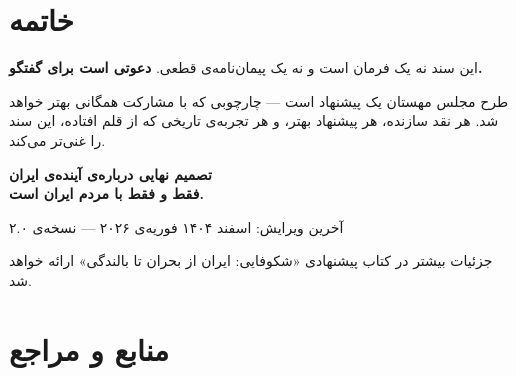 \chapter*{خاتمه}

\begin{summarybox}
این سند نه یک فرمان است و نه یک پیمان‌نامه‌ی قطعی. \textbf{دعوتی است برای گفتگو.}

طرح مجلس مهستان یک پیشنهاد است --- چارچوبی که با مشارکت همگانی بهتر خواهد شد.
هر نقد سازنده، هر پیشنهاد بهتر، و هر تجربه‌ی تاریخی که از قلم افتاده، این سند را
غنی‌تر می‌کند.

\begin{center}
{\large\color{MahestanDarkBlue}\bfseries
تصمیم نهایی درباره‌ی آینده‌ی ایران\\[0.3em]
فقط و فقط با مردم ایران است.}
\end{center}
\end{summarybox}

\vspace{2cm}
\begin{flushright}
\small\color{MahestanGray}
آخرین ویرایش: اسفند ۱۴۰۴ \lr{/} فوریه‌ی ۲۰۲۶ --- نسخه‌ی ۲.۰

\vspace{0.3cm}
جزئیات بیشتر در کتاب پیشنهادی «شکوفایی: ایران از بحران تا بالندگی» ارائه خواهد شد.
\end{flushright}

\backmatter
\chapter*{منابع و مراجع}

